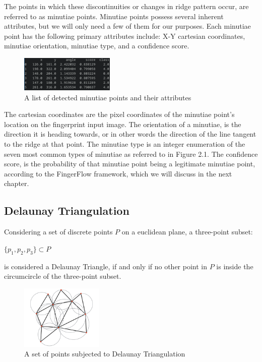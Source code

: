 \documentclass[fyp]{socreport}
\begin{document}
\newpage The points in which these discontinuities or changes in ridge pattern occur, are referred to as minutiae points. Minutiae points possess several inherent attributes, but we will only need a few of them for our purposes. Each minutiae point has the following primary attributes include: X-Y cartesian coordinates, minutiae orientation, minutiae type, and a confidence score.

\begin{figure}[H]
	\centering
	\includegraphics[width=0.4\textwidth]
	{minutiae_pandas}
	\caption{A list of detected minutiae points and their attributes}
\end{figure}

The cartesian coordinates are the pixel coordinates of the minutiae point's location on the fingerprint input image. The orientation of a minutiae, is the direction it is heading towards, or in other words the direction of the line tangent to the ridge at that point. The minutiae type is an integer enumeration of the seven most common types of minutiae as referred to in Figure 2.1. The confidence score, is the probability of that minutiae point being a legitimate minutiae point, according to the FingerFlow framework, which we will discuss in the next chapter.

\subsection{Delaunay Triangulation}
Considering a set of discrete points $P$ on a euclidean plane, a three-point subset:

\begin{center}
	$\{p_1, p_2, p_3\} \subset P$
\end{center}
 is considered a Delaunay Triangle, if and only if no other point in $P$ is inside the circumcircle of the three-point subset. \cite{delaunay34trig}
 
\begin{figure}[H]
	\centering
	\includegraphics[width=0.35\textwidth]
	{delaunay}
	\caption{A set of points subjected to Delaunay Triangulation}
\end{figure}
\end{document}
